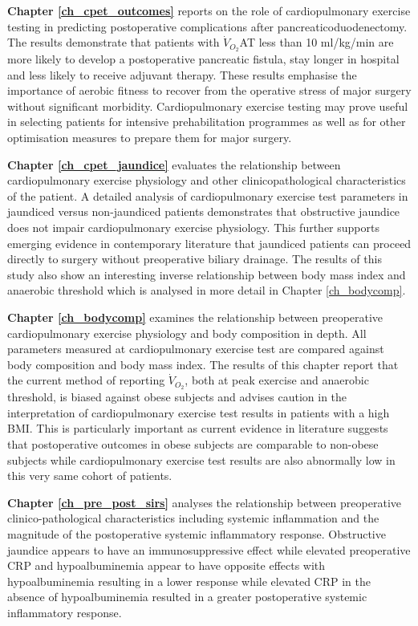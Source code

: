 \documentclass[12pt, oneside]{Thesis} %
\begin{document}
{\clearpage

\textbf{Chapter \ref{ch_cpet_outcomes}} reports on the role of cardiopulmonary exercise testing in predicting postoperative complications after pancreaticoduodenectomy. 
The results demonstrate that patients with $\dot{V}_{O_2}$AT less than 10 ml/kg/min are more likely to develop a postoperative pancreatic fistula, stay longer in hospital and less likely to receive adjuvant therapy. 
These results emphasise the importance of aerobic fitness to recover from the operative stress of major surgery without significant morbidity. 
Cardiopulmonary exercise testing may prove useful in selecting patients for intensive prehabilitation programmes as well as for other optimisation measures to prepare them for major surgery.

\textbf{Chapter \ref{ch_cpet_jaundice}} evaluates the relationship between cardiopulmonary exercise physiology and other clinicopathological characteristics of the patient. 
A detailed analysis of cardiopulmonary exercise test parameters in jaundiced versus non-jaundiced patients demonstrates that obstructive jaundice does not impair cardiopulmonary exercise physiology. 
This further supports emerging evidence in contemporary literature that jaundiced patients can proceed directly to surgery without preoperative biliary drainage. 
The results of this study also show an interesting inverse relationship between body mass index and anaerobic threshold which is analysed in more detail in Chapter \ref{ch_bodycomp}. 

\textbf{Chapter \ref{ch_bodycomp}} examines the relationship between preoperative cardiopulmonary exercise physiology and body composition in depth. 
All parameters measured at cardiopulmonary exercise test are compared against body composition and body mass index. 
The results of this chapter report that the current method of reporting $\dot{V}_{O_2}$, both at peak exercise and anaerobic threshold, is biased against obese subjects and advises caution in the interpretation of cardiopulmonary exercise test results in patients with a high BMI. 
This is particularly important as current evidence in literature suggests that postoperative outcomes in obese subjects are comparable to non-obese subjects while cardiopulmonary exercise test results are also abnormally low in this very same cohort of patients.

\clearpage

\textbf{Chapter \ref{ch_pre_post_sirs}} analyses the relationship between preoperative clinico-pathological characteristics including systemic inflammation and the magnitude of the postoperative systemic inflammatory response. 
Obstructive jaundice appears to have an immunosuppressive effect while elevated preoperative CRP and hypoalbuminemia appear to have opposite effects with hypoalbuminemia resulting in a lower response while elevated CRP in the absence of hypoalbuminemia resulted in a greater postoperative systemic inflammatory response.

}
\end{document}
